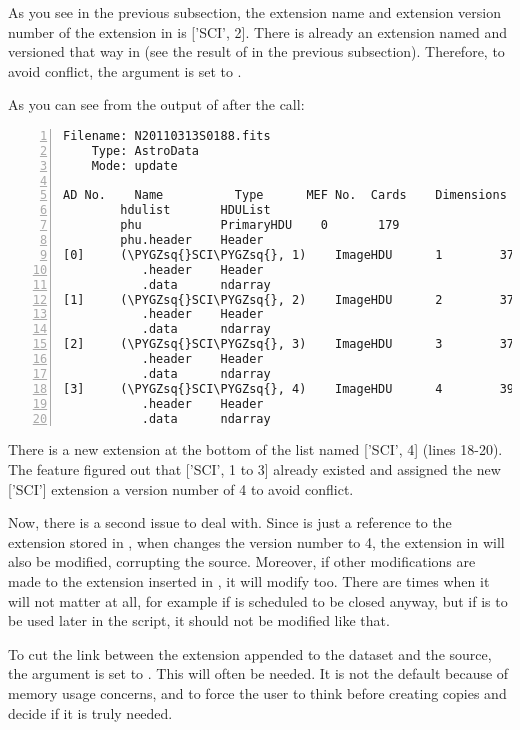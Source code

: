 \documentclass[letterpaper,10pt,english]{sphinxmanual}
\def\PYGZsq{\char`\'}
\begin{document}
As you see in the previous subsection, the extension name and extension
version number of the extension in  is {[}'SCI', 2{]}.  There
is already an extension named and versioned that way in  (see the
result of  in the previous subsection).  Therefore, to avoid
conflict, the argument  is set to .

As you can see from the output of  after the  call:

\begin{Verbatim}[commandchars=\\\{\},numbers=left,firstnumber=1,stepnumber=1]
Filename: N20110313S0188.fits
    Type: AstroData
    Mode: update

AD No.    Name          Type      MEF No.  Cards    Dimensions   Format
        hdulist       HDUList
        phu           PrimaryHDU    0       179
        phu.header    Header
[0]     (\PYGZsq{}SCI\PYGZsq{}, 1)    ImageHDU      1        37    (2304, 1056)  float32
           .header    Header
           .data      ndarray
[1]     (\PYGZsq{}SCI\PYGZsq{}, 2)    ImageHDU      2        37    (2304, 1056)  float32
           .header    Header
           .data      ndarray
[2]     (\PYGZsq{}SCI\PYGZsq{}, 3)    ImageHDU      3        37    (2304, 1056)  float32
           .header    Header
           .data      ndarray
[3]     (\PYGZsq{}SCI\PYGZsq{}, 4)    ImageHDU      4        39    (2304, 1056)  float32
           .header    Header
           .data      ndarray
\end{Verbatim}

There is a new extension at the bottom of the list named {[}'SCI', 4{]} (lines
18-20).  The  feature figured out that {[}'SCI', 1 to 3{]} already
existed and assigned the new {[}'SCI'{]} extension a version number of 4 to avoid
conflict.

Now, there is a second issue to deal with.  Since  is just
a reference to the extension stored in , when 
changes the version number to 4, the extension in  will also be
modified, corrupting the source.  Moreover, if other modifications are made
to the extension inserted in , it will modify  too. There are
times when it will not matter at all, for example if  is scheduled to be closed anyway,
but if  is to be used later in the script, it should not be modified
like that.

To cut the link between the extension appended to the dataset and the
source, the argument  is set to .  This will often be
needed.  It is not the default because of memory usage concerns, and to force
the user to think before creating copies and decide if it is truly needed.
\end{document}
